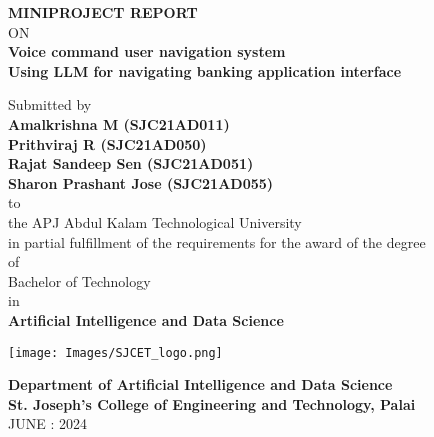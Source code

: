 \thispagestyle{empty}
\begin{center}
 
{\normalsize \bf MINIPROJECT REPORT}\\
ON\\
\vspace*{0.2 cm}
{\huge \bf Voice command user navigation system}\\
{\normalsize \bf Using LLM for navigating banking application interface}

   \vspace{0.5 cm}
   \large Submitted by\\
   { \bf Amalkrishna M (SJC21AD011)}\\
   { \bf Prithviraj R (SJC21AD050)}\\
   { \bf Rajat Sandeep Sen (SJC21AD051)}\\
   { \bf Sharon Prashant Jose (SJC21AD055)}\\[-0.6mm]
  {\large to\\[-0.6mm] the APJ Abdul Kalam Technological University\\[-0.6mm] in partial fulfillment of the requirements for the award of the degree\\[-0.6mm] of\\[-0.6mm] Bachelor of Technology\\[-0.6mm] in\\[-0.6mm] {\bf Artificial Intelligence and Data Science}}
  
   \begin{center}
   \texttt{[image: Images/SJCET\_logo.png]}
   \end{center}
   \vspace*{-0.5cm}
  {\LARGE {\bf Department of Artificial Intelligence and Data Science}}\\
          [-3mm] {\large {\bf St. Joseph's College of Engineering and Technology, Palai}\\
           [1mm] JUNE : 2024}

\end{center}
\newpage
\thispagestyle{empty}
